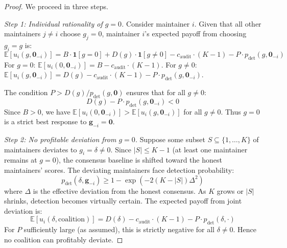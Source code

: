 \documentclass[12pt,a4paper]{article}
\theoremstyle{remark}
\newcommand{\E}{\mathbb{E}}
\newcommand{\indicator}{\mathbf{1}}
\newcommand{\auditCost}{c_{\text{audit}}}
\begin{document}
\begin{proof}
We proceed in three steps.

\textit{Step 1: Individual rationality of $g = 0$.}
Consider maintainer $i$. Given that all other maintainers $j \neq i$ choose
$g_j = 0$, maintainer $i$'s expected payoff from choosing $g_i = g$ is:
\begin{equation}
    \E[u_i(g, \mathbf{0}_{-i})] = B \cdot \indicator[g = 0] + D(g) \cdot \indicator[g \neq 0] 
    - \auditCost \cdot (K-1) - P \cdot p_{\text{det}}(g, \mathbf{0}_{-i})
\end{equation}
For $g = 0$: $\E[u_i(0, \mathbf{0}_{-i})] = B - \auditCost \cdot (K-1)$.
For $g \neq 0$: $\E[u_i(g, \mathbf{0}_{-i})] = D(g) - \auditCost \cdot (K-1) - P \cdot p_{\text{det}}(g, \mathbf{0}_{-i})$.

The condition $P > D(g) / p_{\text{det}}(g, \mathbf{0})$ ensures that for all $g \neq 0$:
\begin{equation}
    D(g) - P \cdot p_{\text{det}}(g, \mathbf{0}_{-i}) < 0
\end{equation}
Since $B > 0$, we have $\E[u_i(0, \mathbf{0}_{-i})] > \E[u_i(g, \mathbf{0}_{-i})]$ for all $g \neq 0$.
Thus $g = 0$ is a strict best response to $\mathbf{g}_{-i} = \mathbf{0}$.

\textit{Step 2: No profitable deviation from $g = 0$.}
Suppose some subset $S \subseteq \{1, \ldots, K\}$ of maintainers deviates to
$g_i = \delta \neq 0$. Since $|S| \leq K-1$ (at least one maintainer remains at
$g = 0$), the consensus baseline is shifted toward the honest maintainers'
scores. The deviating maintainers face detection probability:
\begin{equation}
    p_{\text{det}}(\delta, \mathbf{g}_{-i}) \geq 1 - \exp\left(-2(K - |S|)\Delta^2\right)
\end{equation}
where $\Delta$ is the effective deviation from the honest consensus. As $K$ grows
or $|S|$ shrinks, detection becomes virtually certain. The expected payoff from
joint deviation is:
\begin{equation}
    \E[u_i(\delta, \text{coalition})] = D(\delta) - \auditCost \cdot (K-1) - P \cdot p_{\text{det}}(\delta, \cdot)
\end{equation}
For $P$ sufficiently large (as assumed), this is strictly negative for all
$\delta \neq 0$. Hence no coalition can profitably deviate.


\end{proof}
\end{document}
